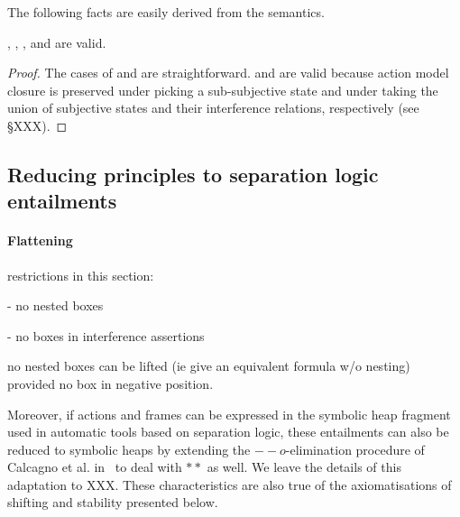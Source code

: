 The following facts are easily derived from the semantics.

\begin{lemma}
  \label{lem:assertion-facts}
  \forgetRule, \mergeRule, \weakenRule, and \copyRule are valid.
\end{lemma}
\begin{proof}
  The cases of \weakenRule and \copyRule are
  straightforward. \forgetRule and \mergeRule are valid because action
  model closure is preserved under picking a sub-subjective state and
  under taking the union of subjective states and their interference
  relations, respectively (see \S XXX).
\end{proof}


\subsection{Reducing \colosl principles to separation logic entailments}
\label{sec:prules}

\paragraph{Flattening}
restrictions in this section:

- no nested boxes

- no boxes in interference assertions

no nested boxes can be lifted (ie give an equivalent formula w/o
nesting) provided no box in negative position.


Moreover, if actions and
frames can be expressed in the symbolic heap fragment used in
automatic tools based on separation logic, these entailments can also
be reduced to symbolic heaps by extending the $--o$-elimination
procedure of Calcagno et al. in~\cite{vv07msc} to deal with $**$ as
well. We leave the details of this adaptation to XXX. These
characteristics are also true of the axiomatisations of shifting and
stability presented below.


